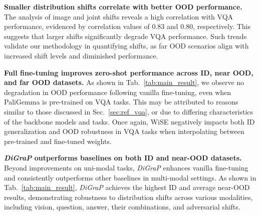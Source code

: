  

\noindent \textbf{Smaller distribution shifts correlate with better OOD performance.} The analysis of image and joint shifts reveals a high correlation with VQA performance, evidenced by correlation values of 0.83 and 0.80, respectively. This suggests that larger shifts significantly degrade VQA performance. Such trends validate our methodology in quantifying shifts, as far OOD scenarios align with increased shift levels and diminished performance. 


\noindent \textbf{Full fine-tuning improves zero-shot performance across ID, near OOD, and far OOD datasets.} 
As shown in Tab.~\ref{tab:main_result}, we observe no degradation in OOD performance following vanilla fine-tuning, even when PaliGemma is pre-trained on VQA tasks. This may be attributed to reasons similar to those discussed in Sec.~\ref{sec:ref_vqa}, or due to differing characteristics of the backbone models and tasks. Once again, WiSE negatively impacts both ID generalization and OOD robustness in VQA tasks when interpolating between pre-trained and fine-tuned weights.


\noindent \textbf{\emph{DiGraP} outperforms baselines on both ID and near-OOD datasets.} Beyond improvements on uni-modal tasks, \emph{DiGraP} enhances vanilla fine-tuning and consistently outperforms other baselines in multi-modal settings. As shown in Tab.~\ref{tab:main_result}, \emph{DiGraP} achieves the highest ID and average near-OOD results, demonstrating robustness to distribution shifts across various modalities, including vision, question, answer, their combinations, and adversarial shifts.

